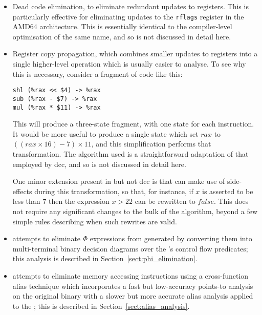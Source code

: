 \begin{itemize}
\item
  Dead code elimination, to eliminate redundant updates to registers.
  This is particularly effective for eliminating updates to the
  \verb|rflags| register in the AMD64 architecture. This is
  essentially identical to the compiler-level optimisation of the same
  name\needCite{}, and so is not discussed in detail here.
\item
  Register copy propagation, which combines smaller updates to
  registers into a single higher-level operation which is usually
  easier to analyse.  To see why this is necessary, consider
  a fragment of code like this:

\begin{verbatim}
shl (%rax << $4) -> %rax
sub (%rax - $7) -> %rax
mul (%rax * $11) -> %rax
\end{verbatim}
  
  This will produce a three-state {\StateMachine} fragment, with one
  state for each instruction.  It would be more useful to produce a
  single state which set $rax$ to $((rax \times 16) - 7) \times 11$,
  and this simplification performs that transformation.  The algorithm
  used is a straightforward adaptation of that employed by
  dcc\needCite{}, and so is not discussed in detail here.

  One minor extension present in {\implementation} but not dcc is that
  {\implementation} can make use of  side-effects during
  this transformation, so that, for instance, if $x$ is asserted to be
  less than $7$ then the expression $x > 22$ can be rewritten to
  $\mathit{false}$.  This does not require any significant changes to
  the bulk of the algorithm, beyond a few simple rules describing when
  such rewrites are valid.
\item
  {\Technique} attempts to eliminate $\Phi$ expressions from generated
  {\StateMachines} by converting them into multi-terminal binary
  decision diagrams over the {\StateMachine}'s control flow predicates;
  this analysis is described in Section~\ref{sect:phi_elimination}.
\item
  {\Technique} attempts to eliminate memory accessing instructions
  using a cross-function alias technique which incorporates a fast but
  low-accuracy points-to analysis on the original binary with a slower
  but more accurate alias analysis applied to the {\StateMachine};
  this is described in Section~\ref{sect:alias_analysis}.
\end{itemize}

